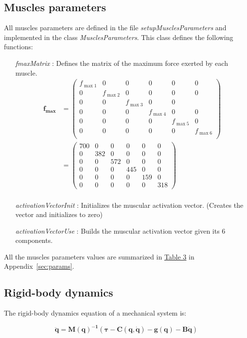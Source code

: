 \documentclass[pdftex,a4paper,12pt]{report}
\begin{document}
\subsection{Muscles parameters}
\label{sec:muscle_parameters}
All muscles parameters are defined in the file \textit{setupMusclesParameters} and implemented in the class \textit{MusclesParameters}.
This class defines the following functions:
\begin{itemize}
\item[\textit{fmaxMatrix}]: Defines the matrix of the maximum force exerted by each muscle.
\begin{align*}
\textbf{f}_\textbf{max}   & = \begin{pmatrix}
f_{\max1} &0&0&0&0&0\\
0& f_{\max2}&0&0&0&0\\
0&0& f_{\max3} &0&0\\
0&0&0& f_{\max4} &0&0\\
0&0&0&0& f_{\max5} &0\\
0&0&0&0&0& f_{\max6}\\
\end{pmatrix} \\& = \begin{pmatrix}
700 &0&0&0&0&0\\
 0&382&0&0&0&0\\
0&0 & 572 & 0&0&0\\
0&0&0&445 &0&0\\
0&0&0&0&159 &0\\
0&0&0&0&0&318
\end{pmatrix}\\
\end{align*}
\item[\textit{activationVectorInit}]: Initializes the muscular activation vector. (Creates the vector and initializes to zero)
\item[\textit{activationVectorUse}]: Builds the muscular activation vector given its 6 components.
\end{itemize}
All the muscles parameters values are summarized in \hyperref[MuscleParamTable]{Table 3} in Appendix~\ref{sec:params}.

\subsection{Rigid-body dynamics}
\label{sec:arm_dynamics}
The rigid-body dynamics equation of a mechanical system is:

 \begin{equation}
\label{eq:rbd}
    \boldsymbol{\ddot{q} = M(q)^{-1} (\tau - C(q, \dot{q}) - g(q)  - B \dot{q})} 
\end{equation}
\end{document}
